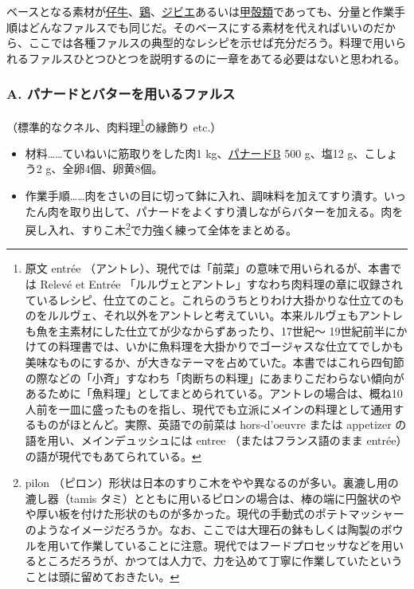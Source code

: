 ベースとなる素材が\ul{仔牛}、\ul{鶏}、\ul{ジビエ}あるいは\ul{甲殻類}であっても、分量と作業手順はどんなファルスでも同じだ。そのベースにする素材を代えればいいのだから、ここでは各種ファルスの典型的なレシピを示せば充分だろう。料理で用いられるファルスひとつひとつを説明するのに一章をあてる必要はないと思われる。
\begin{recette}
\hypertarget{farce-a}{%
\subsubsection{A. パナードとバターを用いるファルス}\label{farce-a}}



（標準的なクネル、肉料理\footnote{原文 entrée
  （アントレ）、現代では「前菜」の意味で用いられるが、本書では Relevé et
  Entrée
  「ルルヴェとアントレ」すなわち肉料理の章に収録されているレシピ、仕立てのこと。これらのうちとりわけ大掛かりな仕立てのものをルルヴェ、それ以外をアントレと考えていい。本来ルルヴェもアントレも魚を主素材にした仕立てが少なからずあったり、17世紀〜
  19世紀前半にかけての料理書では、いかに魚料理を大掛かりでゴージャスな仕立てでしかも美味なものにするか、が大きなテーマを占めていた。本書ではこれら四旬節の際などの「小斉」すなわち「肉断ちの料理」にあまりこだわらない傾向があるために「魚料理」としてまとめられている。アントレの場合は、概ね10人前を一皿に盛ったものを指し、現代でも立派にメインの料理として通用するものがほとんど。実際、英語での前菜は
  hors-d'oeuvre または appetizer の語を用い、メインデュッシュには entree
  （またはフランス語のまま entrée）の語が現代でもあてられている。}の縁飾り
etc.）

\begin{itemize}
\item
  材料\ldots{}\ldots{}ていねいに筋取りをした肉1
  kg、\protect\hyperlink{panade-b}{パナードB} 500 g、塩12 g、こしょう2
  g、全卵4個、卵黄8個。
\item
  作業手順\ldots{}\ldots{}肉をさいの目に切って鉢に入れ、調味料を加えてすり潰す。いったん肉を取り出して、パナードをよくすり潰しながらバターを加える。肉を戻し入れ、すりこ木\footnote{pilon
    （ピロン）形状は日本のすりこ木をやや異なるのが多い。裏漉し用の漉し器（tamis
    タミ）とともに用いるピロンの場合は、棒の端に円盤状のやや厚い板を付けた形状のものが多かった。現代の手動式のポテトマッシャーのようなイメージだろうか。なお、ここでは大理石の鉢もしくは陶製のボウルを用いて作業していることに注意。現代ではフードプロセッサなどを用いるところだろうが、かつては人力で、力を込めて丁寧に作業していたということは頭に留めておきたい。}で力強く練って全体をまとめる。
\end{itemize}


\end{recette}
